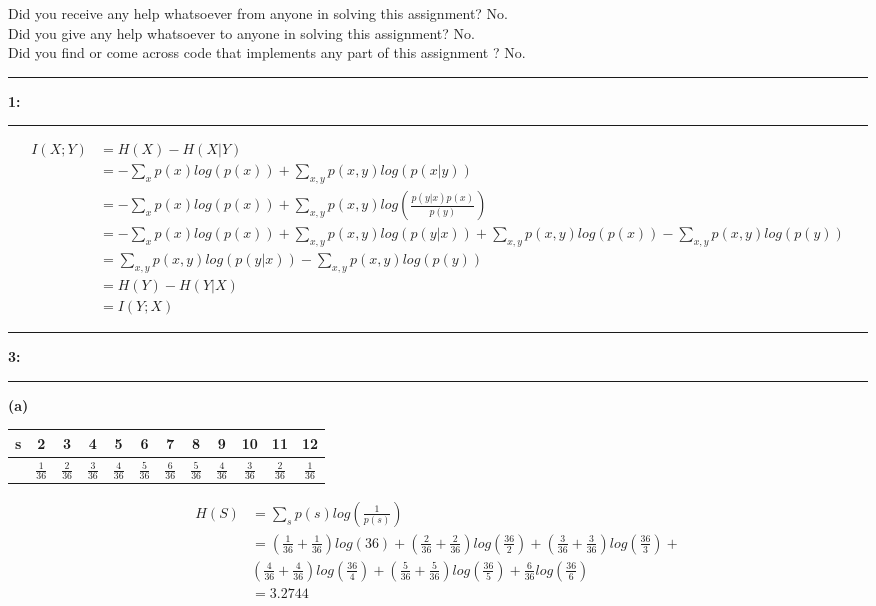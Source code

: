 \documentclass[11pt]{article}
\newcommand\question[2]{\vspace{.25in}\hrule\textbf{#1: #2}\vspace{.5em}\hrule\vspace{.10in}}
\renewcommand\part[1]{\vspace{.20in}\textbf{(#1)}}
\begin{document}
\raggedright
\newcommand\NAME{Yuzhu Zhang}  %
\newcommand\ANDREWID{yuzhuz}     %
\newcommand\HWNUM{6}              %


Did you receive any help whatsoever from anyone in solving this assignment? No.\\
Did you give any help whatsoever to anyone in solving this assignment? No.\\
Did you find or come across code that implements any part of this assignment ? No.\\

\question{1}{} 
\begin{align*}
I(X;Y) &= H(X)-H(X|Y)\\
 &= -\sum_{x}p(x)log(p(x)) + \sum_{x,y}p(x,y)log(p(x|y))\\
 &= -\sum_{x}p(x)log(p(x)) + \sum_{x,y}p(x,y)log(\frac{p(y|x)p(x)}{p(y)})\\
 &= -\sum_{x}p(x)log(p(x)) + \sum_{x,y}p(x,y)log(p(y|x)) + \sum_{x,y}p(x,y)log(p(x)) - \sum_{x,y}p(x,y)log(p(y))  \\
 &= \sum_{x,y}p(x,y)log(p(y|x)) - \sum_{x,y}p(x,y)log(p(y)) \\
	& = H(Y) - H(Y|X)\\
	& = I(Y;X)
\end{align*}

\question{3}{}
\part{a}
\begin{center}
	\begin{tabular}{c|c|c|c|c|c|c|c|c|c|c|c}
  s & 2& 3& 4& 5& 6&  7& 8& 9&  10& 11& 12\\
  \hline
   & $\frac{1}{36}$& $\frac{2}{36}$& $\frac{3}{36}$& $\frac{4}{36}$& $\frac{5}{36}$&  $\frac{6}{36}$& $\frac{5}{36}$& $\frac{4}{36}$&  $\frac{3}{36}$& $\frac{2}{36}$& $\frac{1}{36}$\\
\end{tabular}
\end{center}
\begin{align*}
	H(S) &= \sum_{s}p(s)log(\frac{1}{p(s)})\\
		&= (\frac{1}{36}+\frac{1}{36})log(36) + (\frac{2}{36}+\frac{2}{36})log(\frac{36}{2}) + (\frac{3}{36}+\frac{3}{36})log(\frac{36}{3})+\\&(\frac{4}{36}+\frac{4}{36})log(\frac{36}{4}) + (\frac{5}{36}+\frac{5}{36})log(\frac{36}{5}) + \frac{6}{36}log(\frac{36}{6})\\
		&=  3.2744
\end{align*}
\end{document}
